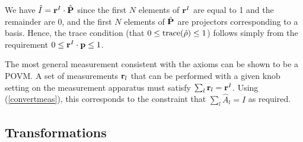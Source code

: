 \documentclass[10pt,twocolumn]{article}
\begin{document}
We have $\hat{I}={\bf r}^I\cdot\hat{\bf P}$ since the first $N$ elements
of ${\bf r}^I$ are equal to 1 and the remainder are 0, and the first $N$
elements of $\hat{\bf P}$ are projectors corresponding to a basis.
Hence, the trace condition (that $0\leq{\rm trace} (\hat{\rho})\leq 1$)
follows simply from the requirement $0\leq{\bf r}^I\cdot{\bf p}\leq 1$.

The most general measurement consistent with the axioms can be shown to
be a POVM.  A set of measurements ${\bf r}_l$ that can be performed with
a given knob setting on the measurement apparatus must satisfy
$\sum_l {\bf r}_l = {\bf r}^I$.  Using (\ref{convertmeas}), this
corresponds to the constraint that $\sum_l \hat{A}_l = I$ as required.

\subsection{Transformations}
\end{document}
